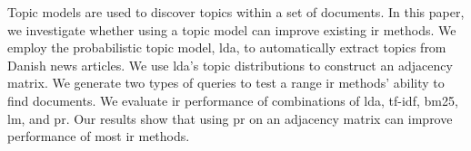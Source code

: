 Topic models are used to discover topics within a set of documents.
In this paper, we investigate whether using a topic model can improve existing \acrlong{ir} methods.
We employ the probabilistic topic model, \acrlong{lda}, to automatically extract topics from Danish news articles.
We use \acrlong{lda}'s topic distributions to construct an adjacency matrix.
We generate two types of queries to test a range \acrlong{ir} methods' ability to find documents.
We evaluate \acrlong{ir} performance of combinations of \acrlong{lda}, \acrlong{tf-idf}, \acrlong{bm25}, \acrlong{lm}, and \acrlong{pr}.
Our results show that using \acrlong{pr} on an adjacency matrix can improve performance of most \acrlong{ir} methods.
